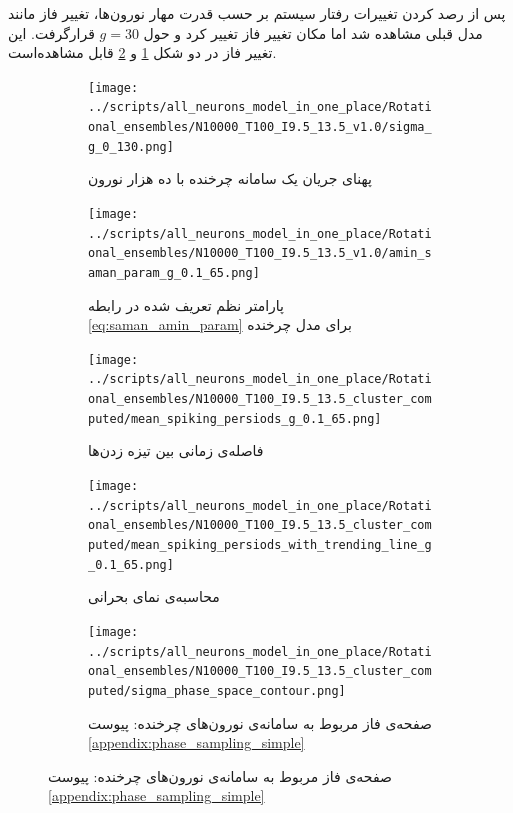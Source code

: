 پس از رصد کردن تغییرات رفتار سیستم بر حسب قدرت مهار نورون‌ها، تغییر فاز مانند مدل قبلی مشاهده شد اما مکان تغییر فاز تغییر کرد و حول $g=30$ قرارگرفت. این تغییر فاز در دو شکل \ref{fig:sigma_rotational} و \ref{fig:amin_saman_rotational}  قابل مشاهده‌است.
\begin{figure}
	\begin{subfigure}[b]{0.5\textwidth}
	\centering
	\texttt{[image: ../scripts/all\_neurons\_model\_in\_one\_place/Rotational\_ensembles/N10000\_T100\_I9.5\_13.5\_v1.0/sigma\_g\_0\_130.png]}
	\caption{پهنای جریان یک سامانه چرخنده با ده هزار نورون}
	\label{fig:sigma_rotational}
	\end{subfigure}
	\hfill
	\begin{subfigure}[b]{0.5\textwidth}
		\centering
		\texttt{[image: ../scripts/all\_neurons\_model\_in\_one\_place/Rotational\_ensembles/N10000\_T100\_I9.5\_13.5\_v1.0/amin\_saman\_param\_g\_0.1\_65.png]}
		\caption{پارامتر نظم تعریف شده در رابطه \ref{eq:saman_amin_param} برای مدل چرخنده }
		\label{fig:amin_saman_rotational}
	\end{subfigure}
	\hfil
	\begin{subfigure}[b]{0.5\textwidth}
		\centering
		\texttt{[image: ../scripts/all\_neurons\_model\_in\_one\_place/Rotational\_ensembles/N10000\_T100\_I9.5\_13.5\_cluster\_computed/mean\_spiking\_persiods\_g\_0.1\_65.png]}
		\caption{فاصله‌ی زمانی بین تیزه زدن‌ها}
		\label{fig:interspikes_rotational}
	\end{subfigure}
	\hfill
	\begin{subfigure}[b]{0.5\textwidth}
		\centering
		\texttt{[image: ../scripts/all\_neurons\_model\_in\_one\_place/Rotational\_ensembles/N10000\_T100\_I9.5\_13.5\_cluster\_computed/mean\_spiking\_persiods\_with\_trending\_line\_g\_0.1\_65.png]}
		\caption{محاسبه‌ی نمای بحرانی}
		\label{fig:interspikes_rotational_trending_line}
	\end{subfigure}
	\hfill
	\begin{subfigure}[b]{0.5\textwidth}
		\centering
		\texttt{[image: ../scripts/all\_neurons\_model\_in\_one\_place/Rotational\_ensembles/N10000\_T100\_I9.5\_13.5\_cluster\_computed/sigma\_phase\_space\_contour.png]}
		\caption{صفحه‌ی فاز مربوط به سامانه‌ی نورون‌های چرخنده: پیوست \ref{appendix:phase_sampling_simple}}
		\label{fig:rot_g_d_phase_space}
	\end{subfigure}
\end{figure}




